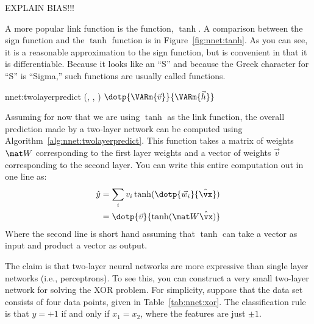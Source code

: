EXPLAIN BIAS!!!

A more popular link function is the 
function, $\tanh$.  A comparison between the sign function and the
$\tanh$ function is in Figure~\ref{fig:nnet:tanh}.  As you can see, it
is a reasonable approximation to the sign function, but is convenient
in that it is differentiable.  Because it looks like an ``S'' and because the
Greek character for ``S'' is ``Sigma,'' such functions are usually
called  functions.

\newalgorithm%
  {nnet:twolayerpredict}%
  {(, , \VAR{$\hat\vx$})}
  {
\ENDFOR
\RETURN $\dotp{\VARm{\vec v}}{\VARm{\vec h}}$
}


Assuming for now that we are using $\tanh$ as the link function, the
overall prediction made by a two-layer network can be computed using
Algorithm~\ref{alg:nnet:twolayerpredict}.  This function takes a
matrix of weights $\mat W$ corresponding to the first layer weights
and a vector of weights $\vec v$ corresponding to the second layer.
You can write this entire computation out in one line as:
%
\begin{align}
\hat y
&= \sum_i v_i \tanh( \dotp{\vec w_i}{\hat\vx} ) \\
&= \dotp{\vec v}{\tanh( \mat W \hat\vx )} \label{eq:nnet:matrixeq}
\end{align}
%
Where the second line is short hand assuming that $\tanh$ can take a
vector as input and product a vector as output.



The claim is that two-layer neural networks are more expressive than
single layer networks (i.e., perceptrons).  To see this, you can
construct a very small two-layer network for solving the XOR problem.
For simplicity, suppose that the data set consists of four data
points, given in Table~\ref{tab:nnet:xor}.  The classification rule is
that $y=+1$ if and only if $x_1=x_2$, where the features are just $\pm
1$.

